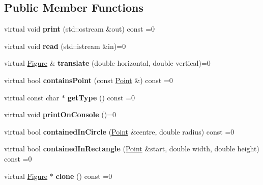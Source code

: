 \subsection*{Public Member Functions}
\begin{DoxyCompactItemize}
\item 
\mbox{\label{class_figure_ac69bb3510421374e28be251b8f93f6c6}} 
virtual void {\bfseries print} (std\+::ostream \&out) const =0
\item 
\mbox{\label{class_figure_a6ad7c96996c6f759bd410e55facc93b1}} 
virtual void {\bfseries read} (std\+::istream \&in)=0
\item 
\mbox{\label{class_figure_a5841bae25099397c1b7b7dbc3fc1fc84}} 
virtual \mbox{\hyperlink{class_figure}{Figure}} \& {\bfseries translate} (double horizontal, double vertical)=0
\item 
\mbox{\label{class_figure_aad4e8eeaca53892fd79b70c9c5520d0c}} 
virtual bool {\bfseries contains\+Point} (const \mbox{\hyperlink{struct_point}{Point}} \&) const =0
\item 
\mbox{\label{class_figure_aab8049ebab496846638154e7ccba44f0}} 
virtual const char $\ast$ {\bfseries get\+Type} () const =0
\item 
\mbox{\label{class_figure_a05ac8256e55beed4678e52fc8d2fc7db}} 
virtual void {\bfseries print\+On\+Console} ()=0
\item 
\mbox{\label{class_figure_a347f6041f771c95921b579a3b9e24a6f}} 
virtual bool {\bfseries contained\+In\+Circle} (\mbox{\hyperlink{struct_point}{Point}} \&centre, double radius) const =0
\item 
\mbox{\label{class_figure_a604521768149b9da1723465ac5374321}} 
virtual bool {\bfseries contained\+In\+Rectangle} (\mbox{\hyperlink{struct_point}{Point}} \&start, double width, double height) const =0
\item 
\mbox{\label{class_figure_ad5d3b452ae6baff36c6766deddd8e061}} 
virtual \mbox{\hyperlink{class_figure}{Figure}} $\ast$ {\bfseries clone} () const =0
\end{DoxyCompactItemize}


